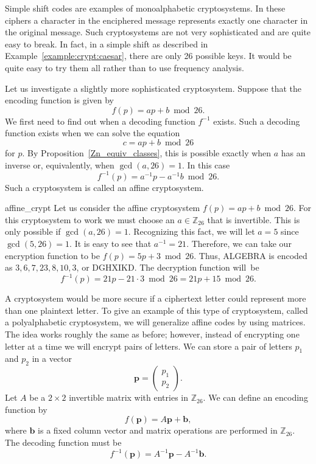  
Simple shift codes are examples of {\bfi monoalphabetic
cryptosystems}. In these ciphers a
character in the enciphered message represents exactly one character
in the original message. Such cryptosystems are not very sophisticated
and are quite easy to break. In fact, in a simple shift as described
in Example~\ref{example:crypt:caesar}, there are only 26 possible keys. It would be quite easy
to try them all rather than to use frequency analysis. 
 
 
Let us investigate a slightly more sophisticated cryptosystem. Suppose
that the encoding function is given by  
\[
f(p) = ap + b \bmod 26.
\]
We first need to find out when a decoding function $f^{-1}$ exists.
Such a decoding function exists when we can solve the equation
\[
c = ap + b \bmod 26
\]
for $p$. By Proposition~\ref{Zn_equiv_classes}, this is possible exactly when $a$ has an
inverse or, equivalently, when $\gcd( a, 26) =1$. In this case 
\[
f^{-1}(p) = a^{-1} p - a^{-1} b \bmod 26.
\]
Such a cryptosystem is called an {\bfi affine
cryptosystem}. 
 
 
\begin{example}{affine_crypt}
Let us consider the affine cryptosystem $f(p) = ap + b \bmod 26$. For
this cryptosystem to work we must choose an $a \in {\mathbb Z}_{26}$
that is invertible. This is only possible if $\gcd(a, 26) = 1$.
Recognizing this fact, we will let $a = 5$ since $\gcd(5, 26) = 1$. It
is easy to see that $a^{-1} = 21$. Therefore, we can take our
encryption function to be $f(p) = 5p + 3 \bmod 26$. Thus, ALGEBRA is
encoded as $3, 6, 7, 23, 8, 10, 3$, or DGHXIKD. The decryption
function will~be   
\[
f^{-1}(p) = 21 p - 21 \cdot 3 \bmod 26 = 21 p + 15 \bmod 26.
\]
\end{example} 
 
A cryptosystem would be more secure if a ciphertext letter could
represent more than one plaintext letter.  To give an example of this
type of cryptosystem, called a {\bfi polyalphabetic
cryptosystem}, we will generalize
affine codes by using matrices. The idea works roughly the same as
before; however, instead of encrypting one letter at a time we will
encrypt pairs of letters.  We can store a pair of letters $p_1$ and
$p_2$ in a vector  
\[
{\mathbf p} = 
\begin{pmatrix}
p_1 \\ p_2
\end{pmatrix}.
\]
Let $A$ be a $2 \times 2$ invertible matrix
with entries in ${\mathbb Z}_{26}$. We can define an encoding function by
\[
f({\mathbf p}) = A {\mathbf p} + {\mathbf b} ,
\]
where ${\mathbf b}$ is a fixed column vector and matrix operations are
performed in ${\mathbb Z}_{26}$. The decoding function must be
\[
f^{-1}({\mathbf p}) = A^{-1} {\mathbf p} - A^{-1} {\mathbf b}.
\]
 
